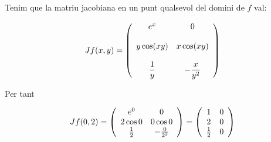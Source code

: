\documentclass[12pt]{article}
\newcommand{\solucio}{\textbf{Soluci{\'o}}\ \ }
\newtheorem{exemple}{Exemple}[subsection]
\newcommand{\R}{\mathbb{R}}
\begin{document}
Tenim que la matriu jacobiana en un punt qualsevol del domini de $f$ val:

\begin{equation*}
Jf(x,y) =  \left( \vspace{0.4cm}\begin{array} {cc}
   e^x & 0 \\
   \\
   y \cos(xy) & x \cos(xy) \\
   \\
   \displaystyle\frac{1}{y} & -\displaystyle\frac{x}{y^2} \\
\end{array} \right)
\end{equation*}

Per tant

\vspace{0.4cm}\begin{equation*}
Jf(0,2) = \left( \vspace{0.4cm}\begin{array} {cc}
   e^0 & 0\\
   2 \cos 0 & 0 \cos 0 \\
   \frac{1}{2} & -\frac{0}{2^2} \\
\end{array} \right) = \left( \vspace{0.4cm}\begin{array} {cc}
   1 & 0 \\
   2 & 0 \\
   \frac{1}{2} & 0 \\
\end{array}\right)
\end{equation*}


%
%
%
\end{document}
